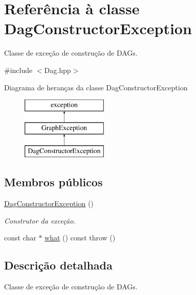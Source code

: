 \hypertarget{classDagConstructorException}{}\section{Referência à classe Dag\+Constructor\+Exception}
\label{classDagConstructorException}


Classe de exceção de construção de D\+A\+Gs.  




{\ttfamily \#include $<$Dag.\+hpp$>$}

Diagrama de heranças da classe Dag\+Constructor\+Exception\begin{figure}[H]
\begin{center}
\leavevmode
\includegraphics[height=3.000000cm]{classDagConstructorException}
\end{center}
\end{figure}
\subsection*{Membros públicos}
\begin{DoxyCompactItemize}
\item 
\mbox{\label{classDagConstructorException_a0c6e8ae8788ed7b42f73f4f1bfb0198f}} 
\hyperlink{classDagConstructorException_a0c6e8ae8788ed7b42f73f4f1bfb0198f}{Dag\+Constructor\+Exception} ()
\begin{DoxyCompactList}\small\item\em Construtor da exceção. \end{DoxyCompactList}\item 
const char $\ast$ \hyperlink{classDagConstructorException_a3ad88177747ce6ef7273d1196258c7ba}{what} () const  throw ()
\end{DoxyCompactItemize}


\subsection{Descrição detalhada}
Classe de exceção de construção de D\+A\+Gs. 

